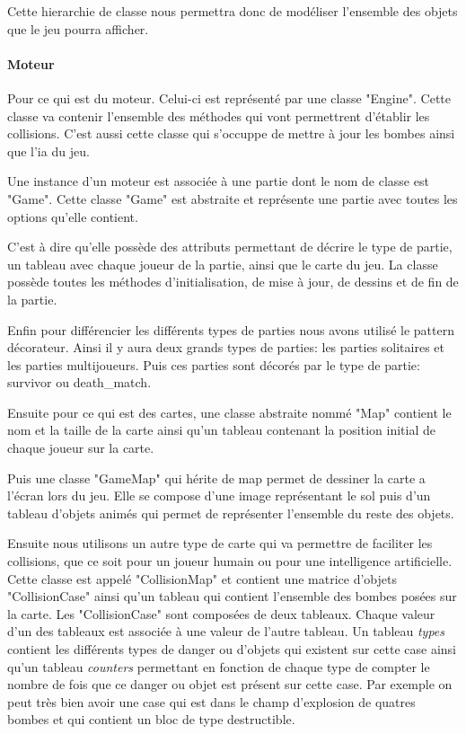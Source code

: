 		Cette hierarchie de classe nous permettra donc de modéliser l'ensemble 
		des objets que le jeu pourra afficher.
	
	
	\paragraph{Moteur\\}
	
		Pour ce qui est du moteur.
		Celui-ci est représenté par une classe "Engine".
		Cette classe va contenir l'ensemble des méthodes qui vont permettrent 
		d'établir les collisions.
		C'est aussi cette classe qui s'occuppe de mettre à jour les bombes 
		ainsi que l'\gls{ia} du jeu.
		
		Une instance d'un moteur est associée à une partie dont le nom de classe est "Game".
		Cette classe "Game" est abstraite et représente une partie avec toutes les options qu'elle contient.
		
		C'est à dire qu'elle possède des attributs permettant de décrire le type de partie,
		un tableau avec chaque joueur de la partie, ainsi que le carte du jeu.
		La classe possède toutes les méthodes d'initialisation, de mise à jour,
		 de dessins et de fin de la partie.
		
		Enfin pour différencier les différents types de parties nous avons utilisé
		 le \gls{pattern} décorateur.
		 Ainsi il y aura deux grands types de parties: les parties solitaires 
		 et les parties multijoueurs.
		 Puis ces parties sont décorés par le type de partie: \gls{survivor} ou \gls{death_match}.
	
		Ensuite pour ce qui est des cartes, une classe abstraite nommé "Map" 
		contient le nom et la taille de la carte ainsi qu'un tableau contenant 
		la position initial de chaque joueur sur la carte.
		
		Puis une classe "GameMap" qui hérite de map permet de dessiner 
		la carte a l'écran lors du jeu.
		Elle se compose d'une image représentant le sol puis d'un tableau 
		d'objets animés qui permet de représenter l'ensemble du reste des objets.
		
		Ensuite nous utilisons un autre type de carte qui va permettre de 
		faciliter les collisions, que ce soit pour un joueur humain ou pour 
		une intelligence artificielle.
		Cette classe est appelé "CollisionMap" et contient une matrice d'objets
		"CollisionCase" ainsi qu'un tableau qui contient l'ensemble des bombes 
		posées sur la carte.
		Les "CollisionCase" sont composées de deux tableaux.
		Chaque valeur d'un des tableaux est associée à une valeur de l'autre tableau.
		Un tableau \textit{types} contient les différents types de danger ou d'objets 
		qui existent sur cette case ainsi qu'un tableau \textit{counters} permettant 
		en fonction de chaque type de compter le nombre de fois que ce danger ou objet 
		est présent sur cette case.
		Par exemple on peut très bien avoir une case qui est dans le champ d'explosion
		de quatres bombes et qui contient un bloc de type destructible.
		
